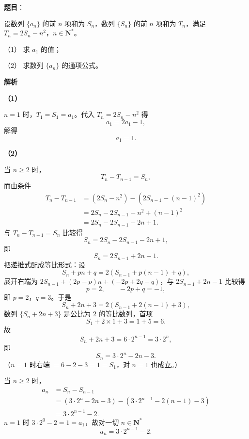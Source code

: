\begin{answer}

\textbf{题目}：

设数列 $\{a_n\}$ 的前 $n$ 项和为 $S_n$，数列 $\{S_n\}$ 的前 $n$ 项和为 $T_n$，满足 $T_n=2S_n-n^2$，$n\in\mathbf N^*$。

（1） 求 $a_1$ 的值；

（2） 求数列 $\{a_n\}$ 的通项公式。

\textbf{解析}

\textbf{（1）}

$n=1$ 时，$T_1=S_1=a_1$。代入 $T_n=2S_n-n^2$ 得
\nopagebreak[4]
\[a_1=2a_1-1,\]
解得
\nopagebreak[4]
\[a_1=1.\]

\textbf{（2）}

当 $n\geqslant2$ 时，
\nopagebreak[4]
\[T_n-T_{n-1}=S_n,\]
而由条件
\nopagebreak[4]
\[\begin{aligned}
T_n-T_{n-1}&=\left(2S_n-n^2\right)-\left(2S_{n-1}-(n-1)^2\right)\\
&=2S_n-2S_{n-1}-n^2+(n-1)^2\\
&=2S_n-2S_{n-1}-2n+1.
\end{aligned}\]
与 $T_n-T_{n-1}=S_n$ 比较得
\nopagebreak[4]
\[S_n=2S_n-2S_{n-1}-2n+1,\]
即
\nopagebreak[4]
\[S_n=2S_{n-1}+2n-1.\]
把递推式配成等比形式：设
\nopagebreak[4]
\[S_n+pn+q=2\left(S_{n-1}+p(n-1)+q\right),\]
展开右端为 $2S_{n-1}+(2p-p)n+(-2p+2q-q)$，与 $2S_{n-1}+2n-1$ 比较得
\nopagebreak[4]
\[p=2,\qquad -2p+q=-1,\]
即 $p=2$，$q=3$。于是
\nopagebreak[4]
\[S_n+2n+3=2\left(S_{n-1}+2(n-1)+3\right),\]
数列 $\{S_n+2n+3\}$ 是公比为 $2$ 的等比数列，首项
\nopagebreak[4]
\[S_1+2\times1+3=1+5=6.\]
故
\nopagebreak[4]
\[S_n+2n+3=6\cdot2^{n-1}=3\cdot2^n,\]
即
\nopagebreak[4]
\[S_n=3\cdot2^n-2n-3.\]
（$n=1$ 时右端 $=6-2-3=1=S_1$，对 $n=1$ 也成立。）

当 $n\geqslant2$ 时，
\nopagebreak[4]
\[\begin{aligned}
a_n&=S_n-S_{n-1}\\
&=\left(3\cdot2^n-2n-3\right)-\left(3\cdot2^{n-1}-2(n-1)-3\right)\\
&=3\cdot2^{n-1}-2.
\end{aligned}\]
$n=1$ 时 $3\cdot2^0-2=1=a_1$，故对一切 $n\in\mathbf N^*$
\nopagebreak[4]
\[a_n=3\cdot2^{n-1}-2.\]



\end{answer}
